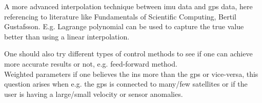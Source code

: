 A more advanced interpolation technique between \gls{imu} data and \gls{gps} data, here referencing to literature like Fundamentals of Scientific Computing, Bertil Gustafsson. E.g. Lagrange polynomial can be used to capture the true value better than using a linear interpolation.\newline


One should also try different types of control methods to see if one can achieve more accurate results or not, e.g. feed-forward method.\\
Weighted parameters if one believes the \gls{ins} more than the \gls{gps} or vice-versa, this question arises when e.g. the \gls{gps} is connected to many/few satellites or if the user is having a large/small velocity or sensor anomalies. 




